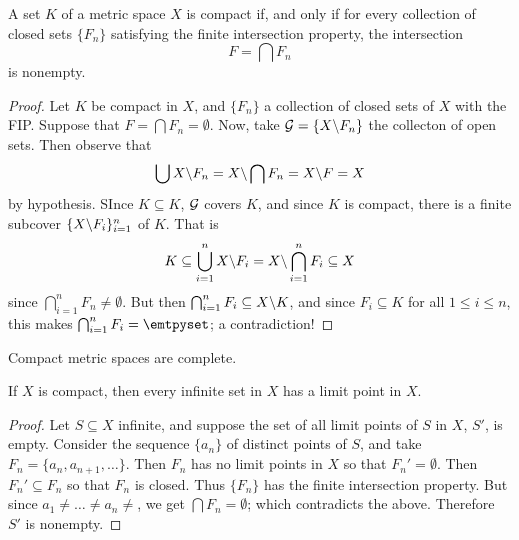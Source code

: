 \begin{lemma}\label{2.4.2}
    A set $K$ of a metric space  $X$ is compact if, and only if for every
    collection of closed sets  $\{F_n\}$ satisfying the finite intersection
    property, the intersection
    \begin{equation*}
        F=\bigcap{F_n}
    \end{equation*}
    is nonempty.
\end{lemma}
\begin{proof}
    Let $K$ be compact in  $X$, and  $\{F_n\}$ a collection of closed sets of
    $X$ with the FIP. Suppose that  $F=\bigcap{F_n}=\emptyset$. Now, take
    $\mathcal{G}=\{X \backslash F_n\}$ the collecton of open sets. Then observe that
    \begin{equation*}
        \bigcup{X \backslash F_n}=X \backslash \bigcap{F_n}=X \backslash F=X
    \end{equation*}
    by hypothesis. SInce $K \subseteq K$,  $\mathcal{G}$ covers  $K$, and since  $K$ is
    compact, there is a finite subcover  $\{X \backslash F_i\}_{i=1}^n$ of $K$. That
    is
    \begin{equation*}
        K  \subseteq \bigcup_{i=1}^n{X \backslash F_i}=X \backslash \bigcap_{i=1}^n{F_i}
        \subseteq X
    \end{equation*}
    since $\bigcap_{i=1}^n{F_n} \neq \emptyset$. But then $\bigcap_{i=1}^n{F_i}
    \subseteq X \backslash K$, and since $F_i \subseteq K$ for all  $1 \leq i \leq
    n$, this makes  $\bigcap_{i=1}^n{F_i}=\emtpyset$; a contradiction!
\end{proof}
\begin{corollary}
    Compact metric spaces are complete.
\end{corollary}
\begin{corollary}
    If $X$ is compact, then every infinite set in $X$ has a limit point in  $X$.
\end{corollary}
\begin{proof}
    Let $S \subseteq X$ infinite, and suppose the set of all limit points of
    $S$ in  $X$,  $S'$, is empty. Consider the sequence  $\{a_n\}$ of distinct
    points of $S$, and take  $F_n=\{a_n,a_{n+1}, \dots\}$. Then $F_n$ has no
    limit points in  $X$ so that  $F_n'=\emptyset$. Then  $F_n' \subseteq F_n$
    so that  $F_n$ is closed. Thus  $\{F_n\}$ has the finite intersection
    property. But since $a_1 \neq \dots \neq a_n \neq$, we get
    $\bigcap{F_n}=\emptyset$; which contradicts the above. Therefore $S'$ is
    nonempty.
\end{proof}

